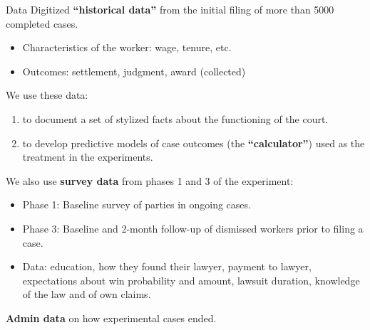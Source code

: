 \documentclass[9pt]{beamer}
\begin{document}
\begin{frame}{Data}
Digitized \textbf{``historical data''} from the initial filing of more than 5000 completed cases.
\vspace{2mm}
        \begin{itemize}
            \item Characteristics of the worker: wage, tenure, etc.
            \item Outcomes: settlement, judgment, award (collected)
        \end{itemize}
        \pause
    \vspace{2mm}
    We use these data:
    \begin{enumerate}
        \item to document a set of \alert{stylized facts} about the functioning of the court.
        \item to develop \alert{predictive models} of case outcomes (the \textbf{``calculator''}) used as the treatment in the experiments.
    \end{enumerate} 
\pause
\vspace{2mm}
We also use \textbf{survey data} from phases 1 and 3 of the experiment:
            \begin{itemize}
                \item Phase 1: Baseline survey of parties in ongoing cases.
                \item Phase 3: Baseline and 2-month follow-up of dismissed workers prior to filing a case.
                \item Data: education, how they found their lawyer, payment to lawyer, expectations about win probability and amount, lawsuit duration, knowledge of the law and of own claims.
                
            \end{itemize}
            
           \vspace{.1in}
            \textbf{Admin data} on how experimental cases ended.
            

\end{frame}
\end{document}
